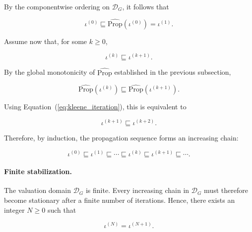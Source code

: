 \documentclass[10pt]{article}
\begin{document}
By the componentwise ordering on $\mathcal D_G$, it follows that

\begin{equation}
	\iota^{(0)}
	\sqsubseteq
	\widehat{\mathrm{Prop}}
	\!\left(
	\iota^{(0)}
	\right)
	=
	\iota^{(1)}.
	\label{eq:initial_iteration_growth}
\end{equation}

Assume now that, for some $k\geq 0$,

\begin{equation}
	\iota^{(k)}
	\sqsubseteq
	\iota^{(k+1)}.
	\label{eq:iteration_induction_hypothesis}
\end{equation}

By the global monotonicity of $\widehat{\mathrm{Prop}}$ established in the
previous subsection,

\begin{equation}
	\widehat{\mathrm{Prop}}
	\!\left(
	\iota^{(k)}
	\right)
	\sqsubseteq
	\widehat{\mathrm{Prop}}
	\!\left(
	\iota^{(k+1)}
	\right).
	\label{eq:iteration_monotone_step}
\end{equation}

Using Equation~(\ref{eq:kleene_iteration}), this is equivalent to

\begin{equation}
	\iota^{(k+1)}
	\sqsubseteq
	\iota^{(k+2)}.
	\label{eq:iteration_induction_step}
\end{equation}

Therefore, by induction, the propagation sequence forms an increasing chain:

\begin{equation}
	\iota^{(0)}
	\sqsubseteq
	\iota^{(1)}
	\sqsubseteq
	\cdots
	\sqsubseteq
	\iota^{(k)}
	\sqsubseteq
	\iota^{(k+1)}
	\sqsubseteq
	\cdots.
	\label{eq:increasing_chain}
\end{equation}

\paragraph{Finite stabilization.}

The valuation domain $\mathcal D_G$ is finite. Every increasing chain in
$\mathcal D_G$ must therefore become stationary after a finite number of
iterations. Hence, there exists an integer $N\geq 0$ such that

\begin{equation}
	\iota^{(N)}
	=
	\iota^{(N+1)}.
	\label{eq:stabilization}
\end{equation}
\end{document}
